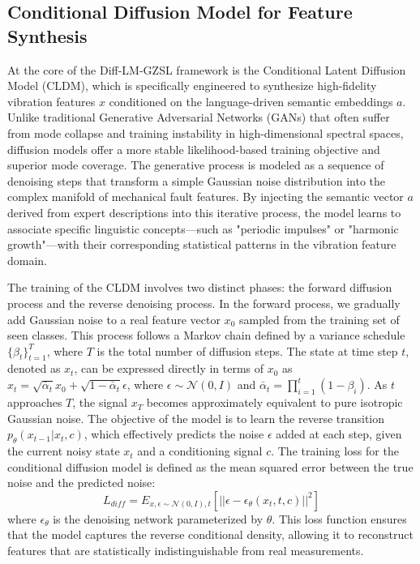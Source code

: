 \subsection{Conditional Diffusion Model for Feature Synthesis}
\label{sec:diffusion}
At the core of the Diff-LM-GZSL framework is the Conditional Latent Diffusion Model (CLDM), which is specifically engineered to synthesize high-fidelity vibration features $x$ conditioned on the language-driven semantic embeddings $a$. Unlike traditional Generative Adversarial Networks (GANs) that often suffer from mode collapse and training instability in high-dimensional spectral spaces, diffusion models offer a more stable likelihood-based training objective and superior mode coverage. The generative process is modeled as a sequence of denoising steps that transform a simple Gaussian noise distribution into the complex manifold of mechanical fault features. By injecting the semantic vector $a$ derived from expert descriptions into this iterative process, the model learns to associate specific linguistic concepts—such as "periodic impulses" or "harmonic growth"—with their corresponding statistical patterns in the vibration feature domain.

The training of the CLDM involves two distinct phases: the forward diffusion process and the reverse denoising process. In the forward process, we gradually add Gaussian noise to a real feature vector $x_0$ sampled from the training set of seen classes. This process follows a Markov chain defined by a variance schedule $\{\beta_t\}_{t=1}^T$, where $T$ is the total number of diffusion steps. The state at time step $t$, denoted as $x_t$, can be expressed directly in terms of $x_0$ as $x_t = \sqrt{\bar{\alpha}_t} x_0 + \sqrt{1 - \bar{\alpha}_t} \epsilon$, where $\epsilon \sim \mathcal{N}(0, I)$ and $\bar{\alpha}_t = \prod_{i=1}^t (1 - \beta_i)$. As $t$ approaches $T$, the signal $x_T$ becomes approximately equivalent to pure isotropic Gaussian noise. The objective of the model is to learn the reverse transition $p_\theta(x_{t-1}|x_t, c)$, which effectively predicts the noise $\epsilon$ added at each step, given the current noisy state $x_t$ and a conditioning signal $c$. The training loss for the conditional diffusion model is defined as the mean squared error between the true noise and the predicted noise:
\begin{equation}
L_{diff} = E_{x, \epsilon \sim \mathcal{N}(0,I), t} \left[ ||\epsilon - \epsilon_\theta(x_t, t, c)||^2 \right]
\end{equation}
where $\epsilon_\theta$ is the denoising network parameterized by $\theta$. This loss function ensures that the model captures the reverse conditional density, allowing it to reconstruct features that are statistically indistinguishable from real measurements.

